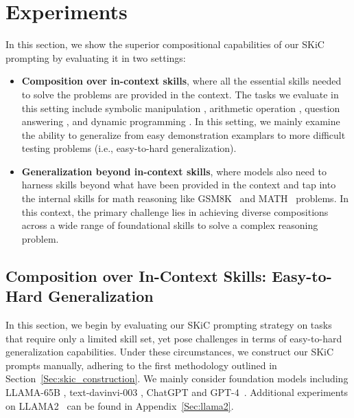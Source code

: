 \section{Experiments}
\label{sec: experiments}
In this section, we show the superior compositional capabilities of our SKiC prompting by evaluating it in two settings:


\begin{itemize}[leftmargin=0.6cm]
  \item \textbf{Composition over in-context skills}, where all the essential skills needed to solve the problems are provided in the context. The tasks we evaluate in this setting  include symbolic manipulation \citep{wei2022chain,zhou2022least,khot2022decomposed}, arithmetic operation \citep{dziri2023faith}, question answering \citep{khot2022decomposed}, and dynamic programming \citep{dziri2023faith}. In this setting, we mainly examine the ability to generalize from easy demonstration examplars to more difficult testing problems (i.e., easy-to-hard generalization).
  
  \item \textbf{Generalization beyond in-context skills}, where models also need to harness skills beyond what have been provided in the context and tap into the internal skills for math reasoning like GSM8K~\citep{wei2022chain,zhou2022least} and MATH~\citep{hendrycks2021measuring} problems. In this context, the primary challenge lies in achieving diverse compositions across a wide range of foundational skills to solve a complex reasoning problem.
\end{itemize}


\subsection{Composition over In-Context Skills: Easy-to-Hard Generalization}

In this section, we begin by evaluating our SKiC prompting strategy on tasks that require only a limited skill set, yet pose challenges in terms of easy-to-hard generalization capabilities. Under these circumstances, we construct our SKiC prompts manually, adhering to the first methodology outlined in Section~\ref{Sec:skic_construction}. We mainly consider foundation models including LLAMA-65B \citep{touvron2023llama1}, text-davinvi-003 \citep{brown2020language}, ChatGPT and GPT-4~\citep{openai2023gpt4}. Additional experiments on LLAMA2~\citep{touvron2023llama} can be found in Appendix~\ref{Sec:llama2}.

